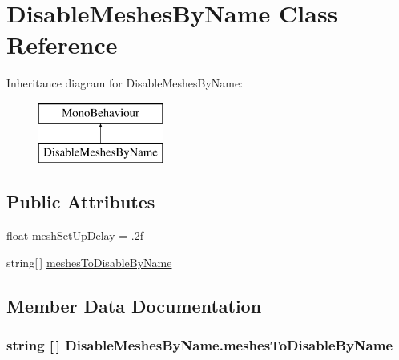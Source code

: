 \hypertarget{class_disable_meshes_by_name}{}\section{Disable\+Meshes\+By\+Name Class Reference}
\label{class_disable_meshes_by_name}
Inheritance diagram for Disable\+Meshes\+By\+Name\+:\begin{figure}[H]
\begin{center}
\leavevmode
\includegraphics[height=2.000000cm]{class_disable_meshes_by_name}
\end{center}
\end{figure}
\subsection*{Public Attributes}
\begin{DoxyCompactItemize}
\item 
float \hyperlink{class_disable_meshes_by_name_a36177b074485adab49e88f98da4cf0f4}{mesh\+Set\+Up\+Delay} = .\+2f
\item 
string\mbox{[}$\,$\mbox{]} \hyperlink{class_disable_meshes_by_name_af71526989c3c0770defbe949b054c6db}{meshes\+To\+Disable\+By\+Name}
\end{DoxyCompactItemize}


\subsection{Member Data Documentation}
\subsubsection[{\texorpdfstring{meshes\+To\+Disable\+By\+Name}{meshesToDisableByName}}]{\setlength{\rightskip}{0pt plus 5cm}string \mbox{[}$\,$\mbox{]} Disable\+Meshes\+By\+Name.\+meshes\+To\+Disable\+By\+Name}\hypertarget{class_disable_meshes_by_name_af71526989c3c0770defbe949b054c6db}{}\label{class_disable_meshes_by_name_af71526989c3c0770defbe949b054c6db}
